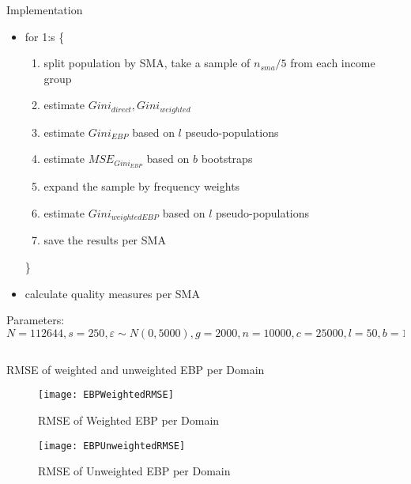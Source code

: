\documentclass[fleqn,final]{beamer}
\newcommand{\Pheight}{\rule[-5mm]{0cm}{1cm}}
\begin{document}
\begin{frame}
\begin{columns}[t]
\begin{column}{.3\linewidth}
\begin{block}{Implementation \Pheight}
\begin{itemize}
\item for 1:s \{
\begin{enumerate}  %
\item split population by SMA, take a sample of $n_{sma} / 5$ from each income group
\item estimate $Gini_{direct}, Gini_{weighted}$
\item estimate $Gini_{EBP}$  based on $l$ pseudo-populations
\item estimate $MSE_{Gini_{EBP}}$ based on $b$ bootstraps
\item expand the sample by frequency weights
\item estimate $Gini_{weighted EBP}$  based on $l$ pseudo-populations
\item save the results per SMA
\end{enumerate}
\}
 
\item calculate quality measures per SMA 
 \end{itemize}
Parameters: $N=112644, s=250, \varepsilon \sim N(0,5000), g=2000, n=10000, c=25000, l=50, b=10, SMA=District$
\end{block}



 
\end{column}



%
%
  
\end{columns}  



\begin{columns}[t]

%


\begin{column}{.3\linewidth}

\begin{block}{RMSE of weighted and unweighted EBP per Domain \Pheight}
\begin{center}
	\begin{figure}
		\texttt{[image: EBPWeightedRMSE]}
		\caption{RMSE of Weighted EBP per Domain}
	\end{figure}
		\begin{figure}
		\texttt{[image: EBPUnweightedRMSE]}
		\caption{RMSE of Unweighted EBP per Domain}
	\end{figure}
\end{center}


\end{block}
\end{column}
\end{columns}
\end{frame}
\end{document}
